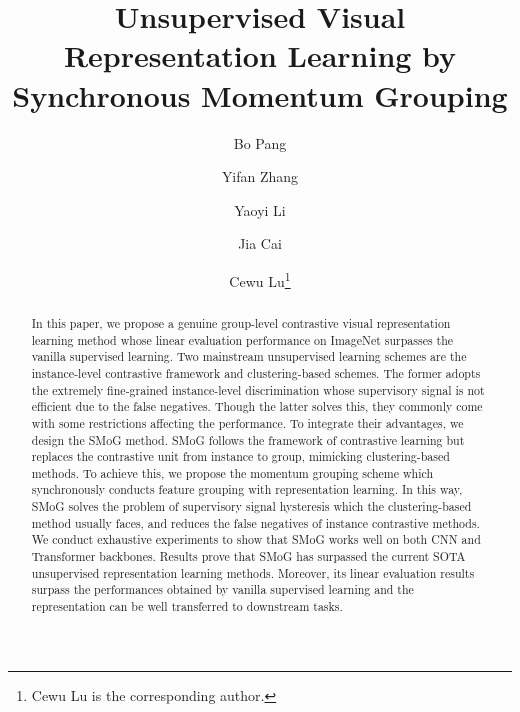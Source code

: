 \documentclass[runningheads]{style/llncs}
\begin{document}
\pagestyle{headings}
\mainmatter
\def\ECCVSubNumber{1316}  

\title{Unsupervised Visual Representation Learning by Synchronous Momentum Grouping} 




\author{Bo Pang\and
Yifan Zhang \and
Yaoyi Li \and
Jia Cai  \and
Cewu Lu\thanks{Cewu Lu is the corresponding author.}}


\maketitle

\begin{abstract}
In this paper, we propose a genuine group-level contrastive visual representation learning method whose linear evaluation performance on ImageNet surpasses the vanilla supervised learning. Two mainstream unsupervised learning schemes are the instance-level contrastive framework and clustering-based schemes. The former adopts the extremely fine-grained instance-level discrimination whose supervisory signal is not efficient due to the false negatives. Though the latter solves this, they commonly come with some restrictions affecting the performance. To integrate their advantages, we design the SMoG method. SMoG follows the framework of contrastive learning but replaces the contrastive unit from instance to group, mimicking clustering-based methods. To achieve this, we propose the momentum grouping scheme which synchronously conducts feature grouping with representation learning. In this way, SMoG solves the problem of supervisory signal hysteresis which the clustering-based method usually faces, and reduces the false negatives of instance contrastive methods. We conduct exhaustive experiments to show that SMoG works well on both CNN and Transformer backbones. Results prove that SMoG has surpassed the current SOTA unsupervised representation learning methods. Moreover, its linear evaluation results surpass the performances obtained by vanilla supervised learning and the representation can be well transferred to downstream tasks.
\end{abstract}
\end{document}
